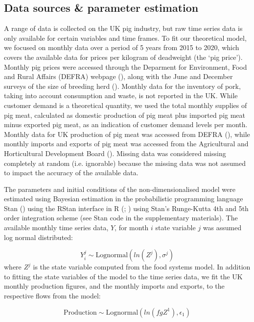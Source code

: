\documentclass[12pt]{article}
\begin{document}
\subsection{Data sources \& parameter estimation}
A range of data is collected on the UK pig industry, but raw time series data is only available for certain variables and time frames. To fit our theoretical model, we focused on monthly data over a period of 5 years from 2015 to 2020, which covers the available data for prices per kilogram of deadweight (the `pig price'). Monthly pig prices were accessed through the Deparment for Environment, Food and Rural Affairs (DEFRA) webpage (\cite{DEFRAlivestockprices}), along with the June and December surveys of the size of breeding herd (\cite{DEFRAlivestocknumbers}). Monthly data for the inventory of pork, taking into account consumption and waste, is not reported in the UK. While customer demand is a theoretical quantity, we used the total monthly supplies of pig meat, calculated as domestic production of pig meat plus imported pig meat minus exported pig meat, as an indication of customer demand levels per month. Monthly data for UK production of pig meat was accessed from DEFRA (\cite{DEFRApigcattlestats2020}), while monthly imports and exports of pig meat was accessed from the Agricultural and Horticultural Development Board (\cite{AHDBpigmeatrade}). Missing data was considered missing completely at random (i.e. ignorable) because the missing data was not assumed to impact the accuracy of the available data.

The parameters and initial conditions of the non-dimensionalised model were estimated using Bayesian estimation in the probabilistic programming language Stan (\cite{carpenter2017}) using the RStan interface in R (\cite{stan2019}; \cite{rcoreteam2020}) using Stan's Runge-Kutta 4th and 5th order integration scheme (see Stan code in the supplementary materials). The available monthly time series data, $Y$, for month $i$ state variable $j$ was assumed log normal distributed:

\begin{equation}
  Y_{i}^{j} \sim \text{Lognormal}( ln( Z^{j} ), \sigma^{j})
\end{equation}
%
where $Z^{j}$ is the state variable computed from the food systems model. In addition to fitting the state variables of the model to the time series data, we fit the UK monthly production figures, and the monthly imports and exports, to the respective flows from the model:

\begin{equation}
  \text{Production} \sim \text{Lognormal}( ln( f g Z^{1} ), \epsilon_{1})
\end{equation}
\end{document}
